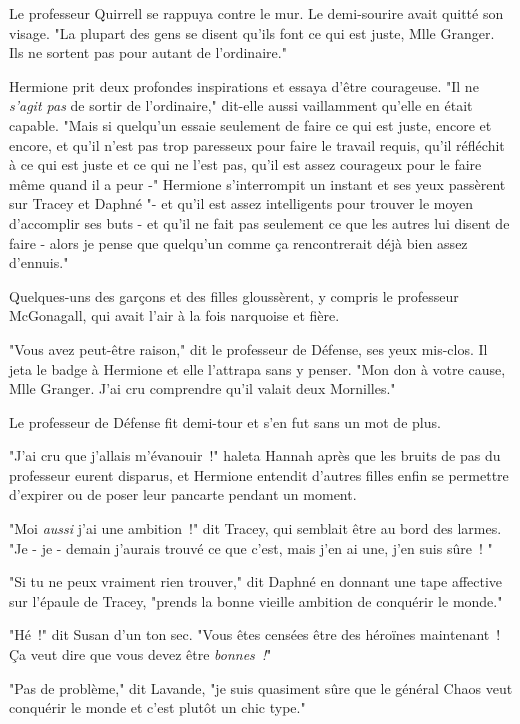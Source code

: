 Le professeur Quirrell se rappuya contre le mur. Le demi-sourire avait quitté son visage. "La plupart des gens se disent qu'ils font ce qui est juste, Mlle Granger. Ils ne sortent pas pour autant de l'ordinaire."

Hermione prit deux profondes inspirations et essaya d'être courageuse. "Il ne \emph{s'agit pas} de sortir de l'ordinaire," dit-elle aussi vaillamment qu'elle en était capable. "Mais si quelqu'un essaie seulement de faire ce qui est juste, encore et encore, et qu'il n'est pas trop paresseux pour faire le travail requis, qu'il réfléchit à ce qui est juste et ce qui ne l'est pas, qu'il est assez courageux pour le faire même quand il a peur -" Hermione s'interrompit un instant et ses yeux passèrent sur Tracey et Daphné "- et qu'il est assez intelligents pour trouver le moyen d'accomplir ses buts - et qu'il ne fait pas seulement ce que les autres lui disent de faire - alors je pense que quelqu'un comme ça rencontrerait déjà bien assez d'ennuis."

Quelques-uns des garçons et des filles gloussèrent, y compris le professeur McGonagall, qui avait l'air à la fois narquoise et fière.

"Vous avez peut-être raison," dit le professeur de Défense, ses yeux mis-clos. Il jeta le badge à Hermione et elle l'attrapa sans y penser. "Mon don à votre cause, Mlle Granger. J'ai cru comprendre qu'il valait deux Mornilles."

Le professeur de Défense fit demi-tour et s'en fut sans un mot de plus.

"J'ai cru que j'allais m'évanouir~!" haleta Hannah après que les bruits de pas du professeur eurent disparus, et Hermione entendit d'autres filles enfin se permettre d'expirer ou de poser leur pancarte pendant un moment.

"Moi \emph{aussi} j'ai une ambition~!" dit Tracey, qui semblait être au bord des larmes. "Je - je - demain j'aurais trouvé ce que c'est, mais j'en ai une, j'en suis sûre~! "

"Si tu ne peux vraiment rien trouver," dit Daphné en donnant une tape affective sur l'épaule de Tracey, "prends la bonne vieille ambition de conquérir le monde."

"Hé~!" dit Susan d'un ton sec. "Vous êtes censées être des héroïnes maintenant~! Ça veut dire que vous devez être \emph{bonnes~!}"

"Pas de problème," dit Lavande, "je suis quasiment sûre que le général Chaos veut conquérir le monde et c'est plutôt un chic type."

